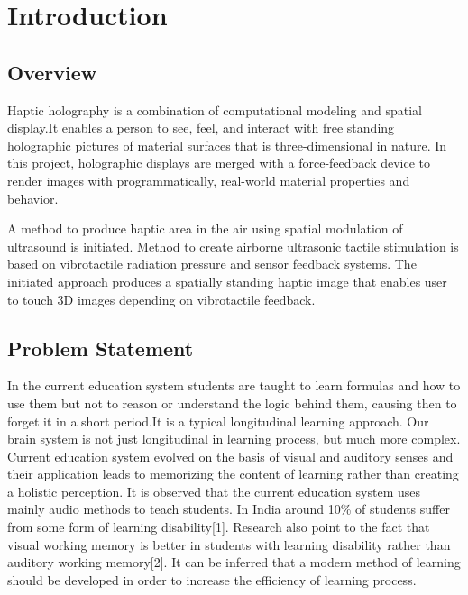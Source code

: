 \documentclass{fisatproject}
\begin{document}
\chapter{Introduction}
\setcounter{page}{1}
\renewcommand{\baselinestretch}{1.50}
\section{Overview}
\par Haptic holography is a combination of computational modeling and spatial display.It enables a person to see, feel, and interact with free standing holographic pictures of material surfaces that is three-dimensional in nature. In this project, holographic displays are merged with a force-feedback device to render images with programmatically, real-world  material properties and behavior.

\par A method to produce haptic area in the air using spatial modulation of ultrasound is initiated. Method to create airborne ultrasonic tactile stimulation is based on vibrotactile radiation pressure and sensor feedback systems. The initiated approach produces a spatially standing haptic image that enables user to touch 3D images  depending on vibrotactile feedback.


\section{Problem Statement}

\par In the current education system students are taught to learn formulas and how to use them but not to reason or understand the logic behind them, causing then to forget it in a short period.It is a typical longitudinal learning approach. Our brain system is not just longitudinal in learning process, but much more complex. Current education system evolved on the basis of visual and auditory senses and their application leads to memorizing the content of learning rather than creating a holistic perception.
It is observed that the current education system  uses mainly audio methods to teach students.
In India around 10\% of students suffer from some form of learning disability[1]. Research also point to the fact that visual working memory is better in students with learning disability rather than auditory working memory[2].
It can be inferred that a modern method of learning should be developed in order to increase the efficiency of learning process.
\end{document}
